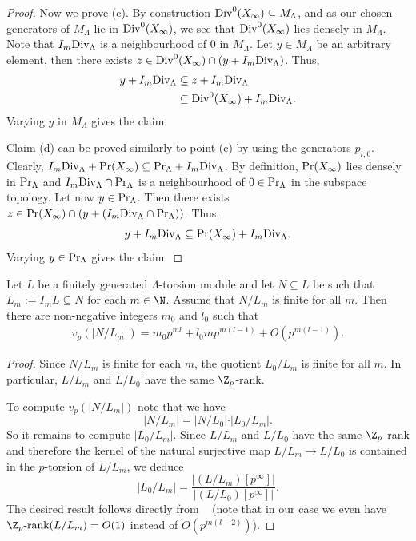 \begin{proof}
	Now we prove (c). By construction $\textup{Div}^0(X_\infty)\subseteq M_\Lambda$, and as our chosen generators of $M_\Lambda$ lie in $\textup{Div}^0(X_\infty)$, we see that $\textup{Div}^0(X_\infty)$ lies densely in $M_\Lambda$. Note that ${I_m\textup{Div}_\Lambda}$ 
	is a neighbourhood of $0$ in $M_\Lambda$. Let $y\in M_\Lambda$ be an arbitrary element, then there exists $z\in \textup{Div}^0(X_\infty)\cap (y+I_m\textup{Div}_\Lambda)$. 
	Thus, 
	\begin{align*} y+I_m\textup{Div}_\Lambda & \subseteq z+I_m\textup{Div}_\Lambda \\ 
		& \subseteq \textup{Div}^0(X_\infty)+I_m\textup{Div}_\Lambda.\end{align*} 
	Varying $y$ in $M_\Lambda$ gives the claim.
	
	Claim (d) can be proved similarly to point (c) by using the generators $p_{i,0}$. Clearly, ${I_m\textup{Div}_\Lambda+\textup{Pr}(X_\infty)\subseteq \textup{Pr}_\Lambda+I_m\textup{Div}_\Lambda}$. By definition, $\textup{Pr}(X_\infty)$ lies densely in $\textup{Pr}_\Lambda$ and $I_m\textup{Div}_\Lambda\cap \textup{Pr}_\Lambda$ is a neighbourhood of $0\in \textup{Pr}_\Lambda$ in the subspace topology. Let now $y\in \textup{Pr}_\Lambda$. Then there exists $z\in \textup{Pr}(X_\infty) \cap (y+(I_m\textup{Div}_\Lambda\cap \textup{Pr}_\Lambda))$. Thus, 
	\[y+I_m\textup{Div}_\Lambda\subseteq \textup{Pr}(X_\infty)+I_m\textup{Div}_\Lambda.\]
	Varying $y\in \textup{Pr}_\Lambda$ gives the claim. 
\end{proof}
\begin{lemma} \label{lemma:NundL} 
	Let $L$ be a finitely generated $\Lambda$-torsion module and let $N\subseteq L$ be such that $L_m:=I_mL\subseteq N$ for each ${m \in \N}$. Assume that $N/L_m$ is finite for all $m$. Then there are non-negative integers $m_0$ and $l_0$ such that
	\begin{align} v_p(\vert N/L_m\vert) = m_0 p^{ml}+l_0 m p^{m(l-1)}+O(p^{m(l-1)}). \label{eq:star} \end{align} 
\end{lemma}
\begin{proof}
	Since $N/L_m$ is finite for each $m$, the quotient $L_0/L_m$ is finite for all $m$. In particular, $L/L_m$ and $L/L_{0}$ have the same $\Z_p$-rank. 
	
	To compute $v_p(\vert N/L_m \vert)$ note that we have
	\[\vert N/L_m\vert = \vert N/L_0\vert \cdot \vert L_0/L_m\vert. \]
	So it remains to compute $\vert L_0/L_m\vert$. 
	Since $L/L_m$ and $L/L_0$ have the same $\Z_p$-rank and therefore the kernel of the natural surjective map ${L/L_m \longrightarrow L/L_0}$ is contained in the $p$-torsion of $L/L_m$, we deduce
	\[\vert L_0/L_m\vert = \frac{\vert (L/L_m)[p^\infty]\vert }{\vert (L/L_0)[p^\infty] \vert}.\]  
	The desired result follows directly from ~\cite[Theorem~3.4]{cuoco-monsky} (note that in our case we even have $\Z_p\textup{-rank}(L/L_m)=O(1)$ instead of $O(p^{m(l-2)})$).
\end{proof}

